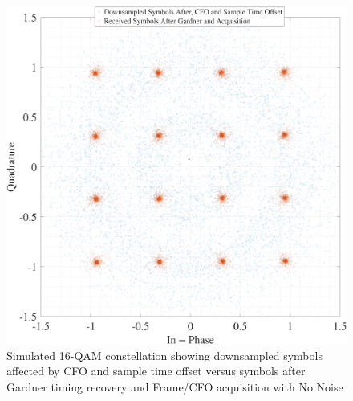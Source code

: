 \documentclass[11pt]{article}
\begin{document}
	\begin{figure}[H]
		\centering
		\includegraphics[width=0.7\linewidth]{Images/const-corrected.png} 
		\caption{Simulated 16-QAM constellation showing downsampled symbols affected by CFO and sample time offset  versus symbols after Gardner timing recovery and Frame/CFO acquisition with No Noise}
		\label{fig:const-corrected}
	\end{figure}
	
\end{document}

